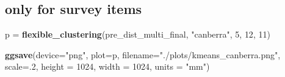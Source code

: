 \documentclass[]{article}
\newenvironment{Shaded}{\begin{snugshade}}{\end{snugshade}}
\newcommand{\KeywordTok}[1]{\textcolor[rgb]{0.13,0.29,0.53}{\textbf{{#1}}}}
\newcommand{\DataTypeTok}[1]{\textcolor[rgb]{0.13,0.29,0.53}{{#1}}}
\newcommand{\DecValTok}[1]{\textcolor[rgb]{0.00,0.00,0.81}{{#1}}}
\newcommand{\StringTok}[1]{\textcolor[rgb]{0.31,0.60,0.02}{{#1}}}
\newcommand{\NormalTok}[1]{{#1}}
\begin{document}
\subsection{only for survey items}\label{only-for-survey-items}

\begin{Shaded}
\begin{Highlighting}[]
\NormalTok{p =}\StringTok{ }\KeywordTok{flexible_clustering}\NormalTok{(pre_dist_multi_final, }\StringTok{"canberra"}\NormalTok{, }\DecValTok{5}\NormalTok{, }\DecValTok{12}\NormalTok{, }\DecValTok{11}\NormalTok{)}

\KeywordTok{ggsave}\NormalTok{(}\DataTypeTok{device=}\StringTok{"png"}\NormalTok{, }\DataTypeTok{plot=}\NormalTok{p, }\DataTypeTok{filename=}\StringTok{"./plots/kmeans_canberra.png"}\NormalTok{,}
       \DataTypeTok{scale=}\NormalTok{.}\DecValTok{2}\NormalTok{, }\DataTypeTok{height =} \DecValTok{1024}\NormalTok{, }\DataTypeTok{width =} \DecValTok{1024}\NormalTok{, }\DataTypeTok{units =} \StringTok{"mm"}\NormalTok{)}
\end{Highlighting}
\end{Shaded}
\end{document}
